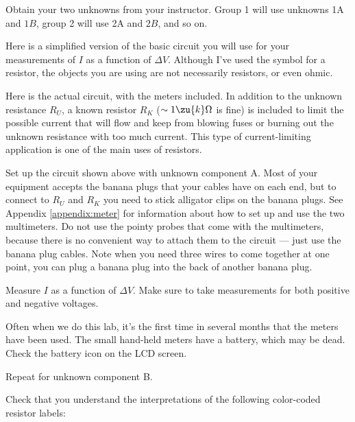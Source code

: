 \setup

Obtain your two unknowns from your instructor. Group 1 will
use unknowns 1A and $1B$, group 2 will use 2A and $2B$, and so on.

Here is a simplified version of the basic circuit you will
use for your measurements of $I$ as a function of $\Delta
V$. Although I've used the symbol for a resistor, the
objects you are using are not necessarily resistors, or even ohmic.  


Here is the actual circuit, with the meters included. In
addition to the unknown resistance $R_U$, a known resistor
$R_K$ ($\sim 1\zu{k}\Omega $ is fine) is included to limit the
possible current that will flow and keep from blowing fuses
or burning out the unknown resistance with too much current.
This type of current-limiting application is one of the
main uses of resistors.




\observations


Set up the circuit shown above with unknown component A.
Most of your equipment accepts the banana plugs that your
cables have on each end, but to connect to $R_U$ and $R_K$
you need to stick alligator clips on the banana plugs. See
Appendix \ref{appendix:meter} for information about how to set up and use the
two multimeters. Do not use the pointy probes that come with
the multimeters, because there is no convenient way to
attach them to the circuit --- just use the banana plug
cables. Note when you need three wires to come together at
one point, you can plug a banana plug into the back of
another banana plug.

Measure $I$ as a function of $\Delta V$. Make sure to take
measurements for both positive and negative voltages.

Often when we do this lab, it's the first time in several months
that the meters have been used. The small hand-held meters have
a battery, which may be dead. Check the battery icon on the LCD screen.


Repeat for unknown component B.

\prelab

\prelabquestion  Check that you understand the interpretations of the
following color-coded resistor labels:

